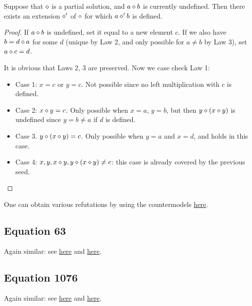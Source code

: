 \begin{lemma}[73 extension]\label{73-extension}  Suppose that $\diamond$ is a partial solution, and $a \diamond b$ is currently undefined.  Then there exists an extension $\diamond'$ of $\diamond$ for which $a \diamond' b$ is defined.
\end{lemma}

\begin{proof} If $a \diamond b$ is undefined, set it equal to a new element $c$.  If we also have $b = d \diamond a$ for some $d$ (unique by Law 2, and only possible for $a \neq b$ by Law 3), set $a \diamond c = d$.

It is obvious that Laws 2, 3 are preserved.   Now we case check Law 1:
\begin{itemize}
\item Case 1: $x=c$ or $y=c$.  Not possible since no left multiplication with $c$ is defined.
\item Case 2: $x \diamond y = c$.  Only possible when $x = a$, $y = b$, but then $y \diamond (x \diamond y)$ is undefined since $y = b \neq a$ if $d$ is defined.
\item Case 3. $y \diamond (x \diamond y) = c$.  Only possible when $y=a$ and $x=d$, and holds in this case.
\item Case 4: $x, y, x \diamond y, y \diamond (x \diamond y) \neq c$: this case is already covered by the previous seed.
\end{itemize}
\end{proof}

One can obtain various refutations by using the countermodels \href{https://leanprover.zulipchat.com/#narrow/channel/458659-Equational/topic/713.2C.201289.2C.201447/near/483735768}{here}.

\subsection{Equation 63}

Again similar: see \href{https://leanprover.zulipchat.com/#narrow/channel/458659-Equational/topic/713.2C.201289.2C.201447/near/482011878}{here} and \href{https://leanprover.zulipchat.com/#narrow/channel/458659-Equational/topic/713.2C.201289.2C.201447/near/483735768}{here}.

\subsection{Equation 1076}

Again similar: see \href{https://leanprover.zulipchat.com/#narrow/channel/458659-Equational/topic/713.2C.201289.2C.201447/near/481875069}{here} and \href{https://leanprover.zulipchat.com/#narrow/channel/458659-Equational/topic/713.2C.201289.2C.201447/near/483735768}{here}.

